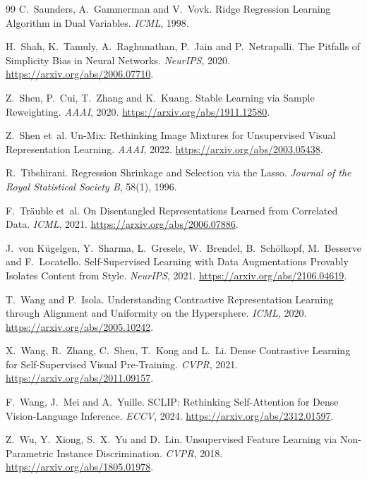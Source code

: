 \documentclass[11pt]{article}
\begin{document}
\begin{thebibliography}{99}
C.~Saunders, A.~Gammerman and V.~Vovk. Ridge Regression Learning Algorithm in Dual Variables. \emph{ICML}, 1998.

H.~Shah, K.~Tamuly, A.~Raghunathan, P.~Jain and P.~Netrapalli. The Pitfalls of Simplicity Bias in Neural Networks.
\emph{NeurIPS}, 2020. \url{https://arxiv.org/abs/2006.07710}.

Z.~Shen, P.~Cui, T.~Zhang and K.~Kuang. Stable Learning via Sample Reweighting. \emph{AAAI}, 2020.
\url{https://arxiv.org/abs/1911.12580}.

Z.~Shen et~al. Un-Mix: Rethinking Image Mixtures for Unsupervised Visual Representation Learning. \emph{AAAI}, 2022.
\url{https://arxiv.org/abs/2003.05438}.

R.~Tibshirani. Regression Shrinkage and Selection via the Lasso. \emph{Journal of the Royal Statistical Society B},
58(1), 1996.

F.~Tr\"auble et~al. On Disentangled Representations Learned from Correlated Data. \emph{ICML}, 2021.
\url{https://arxiv.org/abs/2006.07886}.

J.~von K\"ugelgen, Y.~Sharma, L.~Gresele, W.~Brendel, B.~Sch\"olkopf, M.~Besserve and F.~Locatello. Self-Supervised
Learning with Data Augmentations Provably Isolates Content from Style. \emph{NeurIPS}, 2021.
\url{https://arxiv.org/abs/2106.04619}.

T.~Wang and P.~Isola. Understanding Contrastive Representation Learning through Alignment and Uniformity on the
Hypersphere. \emph{ICML}, 2020. \url{https://arxiv.org/abs/2005.10242}.

X.~Wang, R.~Zhang, C.~Shen, T.~Kong and L.~Li. Dense Contrastive Learning for Self-Supervised Visual Pre-Training.
\emph{CVPR}, 2021. \url{https://arxiv.org/abs/2011.09157}.

F.~Wang, J.~Mei and A.~Yuille. SCLIP: Rethinking Self-Attention for Dense Vision-Language Inference. \emph{ECCV}, 2024.
\url{https://arxiv.org/abs/2312.01597}.

Z.~Wu, Y.~Xiong, S.~X.~Yu and D.~Lin. Unsupervised Feature Learning via Non-Parametric Instance Discrimination.
\emph{CVPR}, 2018. \url{https://arxiv.org/abs/1805.01978}.


\end{thebibliography}
\end{document}
